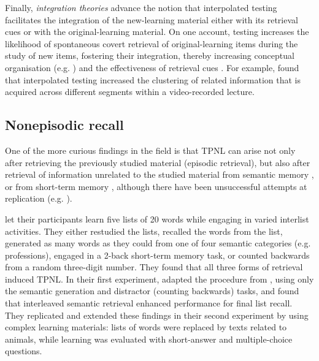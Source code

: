 \documentclass[../main.tex]{subfiles}
\begin{document}
Finally, \textit{integration theories} advance the notion that interpolated testing facilitates the integration of the new-learning material either with its retrieval cues or with the original-learning material. On one account, testing increases the likelihood of spontaneous covert retrieval of original-learning items during the study of new items, fostering their integration, thereby increasing conceptual organisation (e.g. \citealp{jingInterpolatedTestingInfluences2016}) and the effectiveness of retrieval cues \citep{pycWhyTestingImproves2010}. For example, \cite{jingInterpolatedTestingInfluences2016} found that interpolated testing increased the clustering of related information that is acquired across different segments within a video-recorded lecture.

\hypertarget{nonepisodic}{%
\subsection{Nonepisodic recall}}

One of the more curious findings in the field is that TPNL can arise not only after retrieving the previously studied material (episodic retrieval), but also after retrieval of information unrelated to the studied material from semantic memory \citep{divisRetrievalSpeedsContext2014, pastotterRetrievalLearningFacilitates2011}, or from short-term memory \citep{pastotterRetrievalLearningFacilitates2011}, although there have been unsuccessful attempts at replication (e.g. \citealp{weinsteinNotAllRetrieval2015}).

\cite{pastotterRetrievalLearningFacilitates2011} let their participants learn five lists of 20 words while engaging in varied interlist activities. They either restudied the lists, recalled the words from the list, generated as many words as they could from one of four semantic categories (e.g. professions), engaged in a 2-back short-term memory task, or counted backwards from a random three-digit number. They found that all three forms of retrieval induced TPNL. In their first experiment, \cite{divisRetrievalSpeedsContext2014} adapted the procedure from \cite{pastotterRetrievalLearningFacilitates2011}, using only the semantic generation and distractor (counting backwards) tasks, and found that interleaved semantic retrieval enhanced performance for final list recall. They replicated and extended these findings in their second experiment by using complex learning materials: lists of words were replaced by texts related to animals, while learning was evaluated with short-answer and multiple-choice questions. 
\end{document}
